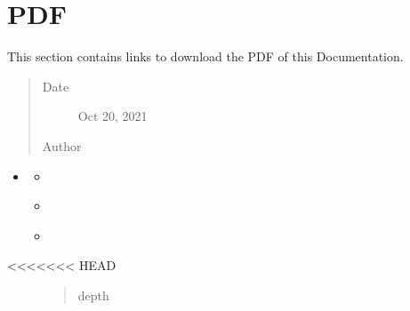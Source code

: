 \documentclass[letterpaper,10pt,english]{sphinxmanual}
\begin{document}
\chapter{PDF}
\label{\detokenize{pdf:pdf}}\label{\detokenize{pdf:pdf-page}}\label{\detokenize{pdf::doc}}
\begin{sphinxShadowBox}

\sphinxAtStartPar
This section contains links to download the PDF of this Documentation.
\begin{quote}\begin{description}
\item[{Date}] \leavevmode
\sphinxAtStartPar
Oct 20, 2021

\item[{Author}] \leavevmode
\sphinxAtStartPar
{}

\end{description}\end{quote}
\end{sphinxShadowBox}

\begin{sphinxShadowBox}
\begin{itemize}
\item {} 
\sphinxAtStartPar
{}\label{\detokenize{pdf:id2}}{\hyperref[\detokenize{pdf:pdf}]{}}
\begin{itemize}
\item {} 
\sphinxAtStartPar
{}\label{\detokenize{pdf:id3}}{\hyperref[\detokenize{pdf:current-manual}]{}}

\item {} 
\sphinxAtStartPar
{}\label{\detokenize{pdf:id4}}{\hyperref[\detokenize{pdf:archived-data}]{}}

\item {} 
\sphinxAtStartPar
{}\label{\detokenize{pdf:id5}}{\hyperref[\detokenize{pdf:id1}]{}}

\end{itemize}

\end{itemize}
\end{sphinxShadowBox}
\begin{description}
\item[{\textless{}\textless{}\textless{}\textless{}\textless{}\textless{}\textless{} HEAD}] \leavevmode\begin{quote}\begin{description}
\item[{depth}] \leavevmode
{}

\end{description}\end{quote}

\end{description}
\end{document}
